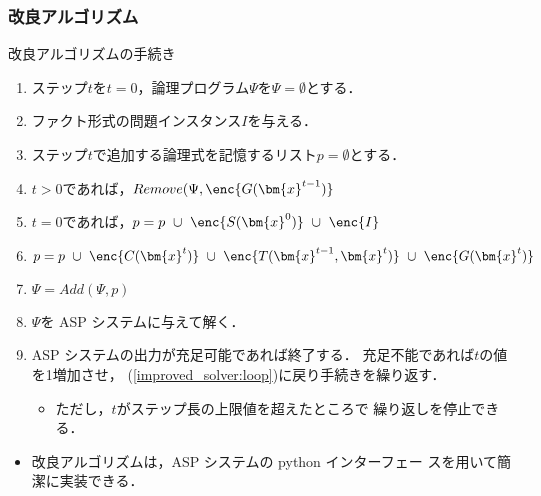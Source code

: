 \begin{frame}\frametitle{改良アルゴリズム}

  \begin{block}{改良アルゴリズムの手続き}
    \begin{enumerate}
    \item ステップ$t$を$t=0$，論理プログラム$\Psi$を$\Psi = \emptyset$とする．
    \item ファクト形式の問題インスタンス$I$を与える．
    \item ステップ$t$で追加する論理式を記憶するリスト$p=\emptyset$とする．
      \label{improved_solver:loop}
    \item $t>0$であれば，$Remove(\Psi, \enc{G(\bm{x}^{t-1})}$
    \item $t=0$であれば，$p = p \ \cup \ \enc{S(\bm{x}^0)}
      \ \cup \ \enc{I}$
    \item $p = p \ \cup \ \enc{C(\bm{x}^{t})} \ \cup \ 
      \enc{T(\bm{x}^{t-1},\bm{x}^{t})} \ \cup \ \enc{G(\bm{x}^{t})}$
    \item $\Psi = Add(\Psi, p)$
    \item $\Psi$を ASP システムに与えて解く．
    \item ASP システムの出力が充足可能であれば終了する．
      充足不能であれば$t$の値を1増加させ，
      (\ref{improved_solver:loop})に戻り手続きを繰り返す．
      \begin{itemize}
      \item ただし，$t$がステップ長の上限値を超えたところで
        繰り返しを停止できる．
      \end{itemize} \label{improved_solver:end}
    \end{enumerate}
  \end{block}

  \begin{itemize}
  \item 改良アルゴリズムは，ASP システム{\clingo}の python インターフェー
    スを用いて簡潔に実装できる．
  \end{itemize}

\end{frame}